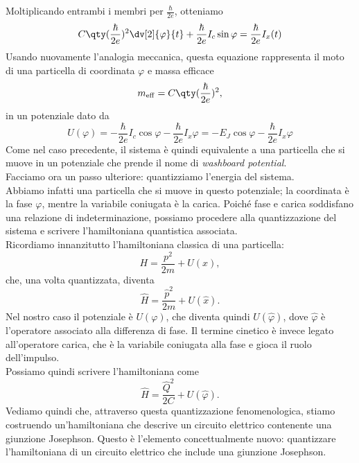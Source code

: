 Moltiplicando entrambi i membri per $\frac{\hbar}{2e}$, otteniamo
\begin{equation*}
    C \qty( \frac{\hbar}{2e} )^2 \dv[2]{\varphi}{t} + \frac{\hbar}{2e} I_c \sin{\varphi} = \frac{\hbar}{2e} I_x(t)
\end{equation*}
Usando nuovamente l'analogia meccanica, questa equazione rappresenta il moto di una particella di coordinata $\varphi$ e massa efficace
\begin{equation*}
    m_{\rm eff}
    =
    C
    \qty(
        \frac{\hbar}{2e}
    )^2,
\end{equation*}
in un potenziale dato da
\begin{equation*}
    U(\varphi)
    = - \frac{\hbar}{2e} I_c \cos{\varphi} - \frac{\hbar}{2e} I_x \varphi
    = - E_J \cos{\varphi} - \frac{\hbar}{2e} I_x \varphi
\end{equation*}
Come nel caso precedente, il sistema è quindi equivalente a una particella che si muove in un potenziale che prende il nome di \emph{washboard potential}.\\
Facciamo ora un passo ulteriore: quantizziamo l'energia del sistema.\\
Abbiamo infatti una particella che si muove in questo potenziale; la coordinata è la fase $\varphi$, mentre la variabile coniugata è la carica. Poiché fase e carica soddisfano una relazione di indeterminazione, possiamo procedere alla quantizzazione del sistema e scrivere l'hamiltoniana quantistica associata.\\
Ricordiamo innanzitutto l'hamiltoniana classica di una particella:
\begin{equation*}
    H
    =
    \frac{p^2}{2m}
    +
    U(x),
\end{equation*}
che, una volta quantizzata, diventa
\begin{equation*}
    \hat{H}
    =
    \frac{\hat{p}^2}{2m}
    +
    U(\hat{x}).
\end{equation*}
Nel nostro caso il potenziale è $U(\varphi)$, che diventa quindi $U(\hat{\varphi})$, dove $\hat{\varphi}$ è l'operatore associato alla differenza di fase. Il termine cinetico è invece legato all'operatore carica, che è la variabile coniugata alla fase e gioca il ruolo dell'impulso.\\
Possiamo quindi scrivere l'hamiltoniana come
\begin{equation*}
    \hat{H}
    =
    \frac{\hat{Q}^2}{2C}
    +
    U(\hat{\varphi}).
\end{equation*}
Vediamo quindi che, attraverso questa quantizzazione fenomenologica, stiamo costruendo un'hamiltoniana che descrive un circuito elettrico contenente una giunzione Josephson. Questo è l'elemento concettualmente nuovo: quantizzare l'hamiltoniana di un circuito elettrico che include una giunzione Josephson.\\
